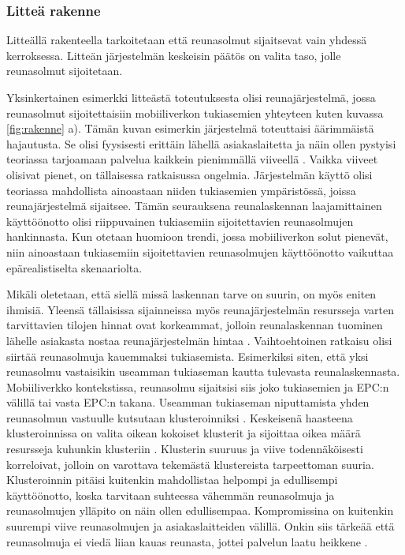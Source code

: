 \subsubsection{Litteä rakenne}
Litteällä rakenteella tarkoitetaan että reunasolmut sijaitsevat vain yhdessä kerroksessa. Litteän järjestelmän keskeisin päätös on valita taso, jolle reunasolmut sijoitetaan.

Yksinkertainen esimerkki litteästä toteutuksesta olisi reunajärjestelmä, jossa reunasolmut sijoitettaisiin mobiiliverkon tukiasemien yhteyteen kuten kuvassa \ref{fig:rakenne} a). Tämän kuvan esimerkin järjestelmä  toteuttaisi äärimmäistä hajautusta. Se olisi fyysisesti erittäin lähellä asiakaslaitetta ja näin ollen pystyisi teoriassa tarjoamaan palvelua kaikkein pienimmällä viiveellä \cite{mach17mobile}.
Vaikka viiveet olisivat pienet, on tällaisessa ratkaisussa ongelmia.
Järjestelmän käyttö olisi teoriassa mahdollista ainoastaan niiden tukiasemien ympäristössä, joissa reunajärjestelmä sijaitsee. Tämän seurauksena reunalaskennan laajamittainen käyttöönotto olisi riippuvainen tukiasemiin sijoitettavien reunasolmujen hankinnasta. Kun otetaan huomioon trendi, jossa mobiiliverkon solut pienevät, niin ainoastaan tukiasemiin sijoitettavien reunasolmujen käyttöönotto vaikuttaa epärealistiselta skenaariolta.

Mikäli oletetaan, että siellä missä laskennan tarve on suurin, on myös eniten ihmisiä. Yleensä tällaisissa sijainneissa myös reunajärjestelmän resursseja varten tarvittavien tilojen hinnat ovat korkeammat, jolloin reunalaskennan tuominen lähelle asiakasta nostaa reunajärjestelmän hintaa \cite{mao17}.
Vaihtoehtoinen ratkaisu olisi siirtää reunasolmuja kauemmaksi tukiasemista. Esimerkiksi siten, että yksi reunasolmu vastaisikin useamman tukiaseman kautta tulevasta reunalaskennasta.
Mobiiliverkko kontekstissa, reunasolmu sijaitsisi siis joko tukiasemien ja EPC:n välillä tai vasta EPC:n takana.  
Useamman tukiaseman niputtamista yhden reunasolmun vastuulle kutsutaan klusteroinniksi \cite{RefWorks:doc:59d4b224e4b015703b881ab9}. 
Keskeisenä haasteena klusteroinnissa on valita oikean kokoiset klusterit ja sijoittaa oikea määrä resursseja kuhunkin klusteriin \cite{malandrino2016close}.
Klusterin suuruus ja viive todennäköisesti korreloivat, jolloin on varottava tekemästä klustereista tarpeettoman suuria.
Klusteroinnin pitäisi kuitenkin mahdollistaa helpompi ja edullisempi käyttöönotto, koska tarvitaan suhteessa vähemmän reunasolmuja ja reunasolmujen ylläpito on näin ollen edullisempaa.
Kompromissina on kuitenkin suurempi viive reunasolmujen ja asiakaslaitteiden välillä. 
Onkin siis tärkeää että reunasolmuja ei viedä liian kauas reunasta, jottei palvelun laatu heikkene \cite{mao17}. 


